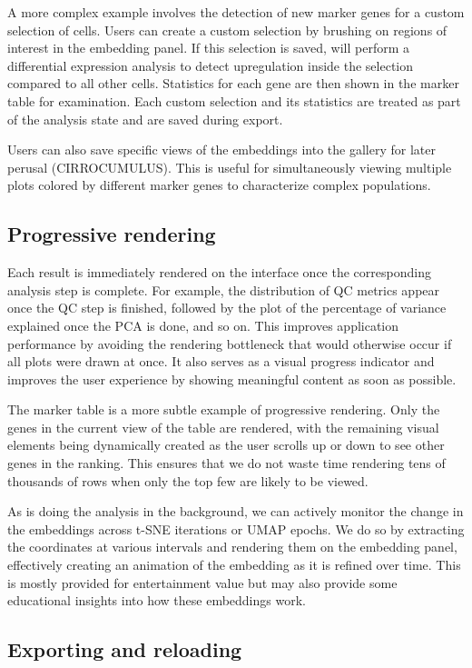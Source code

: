 \documentclass{article}
\begin{document}
A more complex example involves the detection of new marker genes for a custom selection of cells.
Users can create a custom selection by brushing on regions of interest in the embedding panel.
If this selection is saved,  will perform a differential expression analysis to detect upregulation inside the selection compared to all other cells.
Statistics for each gene are then shown in the marker table for examination.
Each custom selection and its statistics are treated as part of the analysis state and are saved during export.

Users can also save specific views of the embeddings into the gallery for later perusal (CIRROCUMULUS).
This is useful for simultaneously viewing multiple plots colored by different marker genes to characterize complex populations.

\subsection{Progressive rendering}

Each result is immediately rendered on the interface once the corresponding analysis step is complete.
For example, the distribution of QC metrics appear once the QC step is finished, followed by the plot of the percentage of variance explained once the PCA is done, and so on.
This improves application performance by avoiding the rendering bottleneck that would otherwise occur if all plots were drawn at once. 
It also serves as a visual progress indicator and improves the user experience by showing meaningful content as soon as possible.

The marker table is a more subtle example of progressive rendering.
Only the genes in the current view of the table are rendered, with the remaining visual elements being dynamically created as the user scrolls up or down to see other genes in the ranking.
This ensures that we do not waste time rendering tens of thousands of rows when only the top few are likely to be viewed.

As  is doing the analysis in the background, we can actively monitor the change in the embeddings across t-SNE iterations or UMAP epochs.
We do so by extracting the coordinates at various intervals and rendering them on the embedding panel,
effectively creating an animation of the embedding as it is refined over time.
This is mostly provided for entertainment value but may also provide some educational insights into how these embeddings work.

\subsection{Exporting and reloading}
\end{document}
